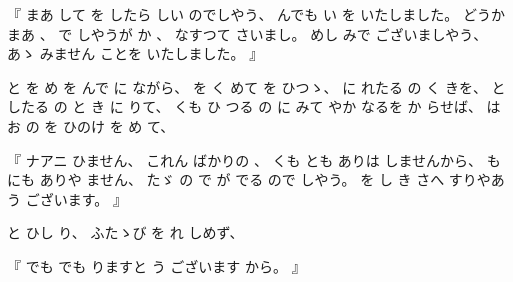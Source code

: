 %
『
まあ
して
を
したら
しい
のでしやう、
%
んでも
い
を
いたしました。
%
どうか
まあ
、
%
で
しやうが
か
、
%
なすつて
さいまし。
%
めし
みで
ございましやう、
%
あゝ%
みません
ことを
いたしました。
』

%
と
を
め
を
んで
に%
ながら、
%
を
く
めて%
を
ひつゝ、%
%
に
れたる
の
く
きを、
%
と
したる
の
と
き
に
りて、
%
くも
ひ
つる
の
に
みて
やか
なるを
か
らせば、
%
は
お
の
を
ひのけ
を
め%
て、

%
『
ナアニ
ひません、
%
これん
ばかりの
、
%
くも
とも
ありは
しませんから、
%
も%
にも
ありや
ません、
%
たゞ%
の
で
が
でる
ので
しやう。
%
を
し
き%
さへ
すりやあ
う
ございます。
』

%
と
ひし
り、
%
ふたゝび%
を
れ
しめず、

%
『
でも
でも
りますと
う
ございます
から。
』


